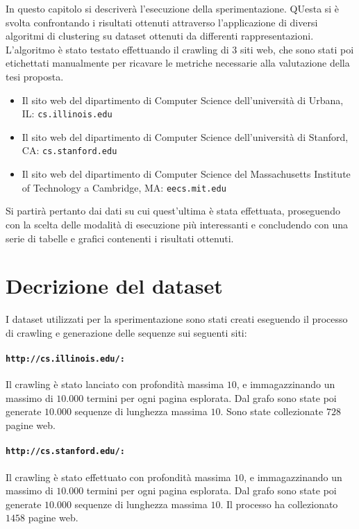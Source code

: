 

In questo capitolo si descriverà l'esecuzione della sperimentazione. QUesta si è svolta confrontando i risultati ottenuti attraverso l'applicazione di diversi algoritmi di clustering su dataset ottenuti da differenti rappresentazioni. L'algoritmo è stato testato effettuando il crawling di $3$ siti web, che sono stati poi etichettati manualmente per ricavare le metriche necessarie alla valutazione della tesi proposta.
\begin{itemize}
\item Il sito web del dipartimento di Computer Science dell'università di Urbana, IL: \texttt{cs.illinois.edu}
\item Il sito web del dipartimento di Computer Science dell'università di Stanford, CA: \texttt{cs.stanford.edu}
\item Il sito web del dipartimento di Computer Science del  Massachusetts Institute of Technology a Cambridge, MA: \texttt{eecs.mit.edu}
\end{itemize}
Si partirà pertanto dai dati su cui quest'ultima è stata effettuata, proseguendo con la scelta delle modalità di esecuzione più interessanti e concludendo con una serie di tabelle e grafici contenenti i risultati ottenuti. 

\section{Decrizione del dataset}
I dataset utilizzati per la sperimentazione sono stati creati eseguendo il processo di crawling e generazione delle sequenze sui seguenti siti:


\paragraph{\texttt{http://cs.illinois.edu/:}}
Il crawling è stato lanciato con profondità massima $10$, e immagazzinando un massimo di $10.000$ termini per ogni pagina esplorata. Dal grafo sono state poi generate $10.000$ sequenze di lunghezza massima $10$. Sono state collezionate $728$ pagine web.


\paragraph{\texttt{http://cs.stanford.edu/:}}
 Il crawling è stato effettuato con profondità massima $10$, e immagazzinando un massimo di $10.000$ termini per ogni pagina esplorata. Dal grafo sono state poi generate $10.000$ sequenze di lunghezza massima $10$. Il processo ha collezionato $1458$ pagine web.

